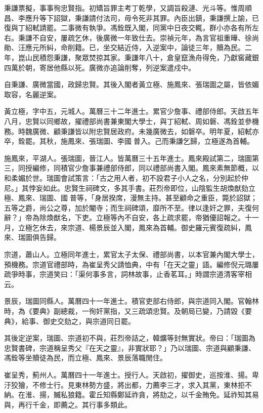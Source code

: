 \begin{pinyinscope}
秉謙票擬，事事徇忠賢指。初矯旨罪主考丁乾學，又調旨殺漣、光斗等。惟周順昌、李應升等下詔獄，秉謙請付法司，毋令死非其罪。內臣出鎮，秉謙撰上諭，已復與丁紹軾請罷。二事微有執爭。馮銓既入閣，同黨中日夜交輒，群小亦各有所左右。秉謙不自安，屢疏乞休，後廣微一年致仕去。崇禎元年，為言官祖重曄、徐尚勛、汪應元所糾，命削籍。已，坐交結近侍，入逆案中，論徒三年，贖為民。二年，崑山民積怨秉謙，聚眾焚掠其家。秉謙年八十，倉皇竄漁舟得免，乃獻窖藏銀四萬於朝，寄居他縣以死。廣微亦追論削奪，列逆案遣戍中。

自秉謙、廣微當國，政歸忠賢。其後入閣者黃立極、施鳳來、張瑞圖之屬，皆依媚取容，名麗逆案。

黃立極，字中五，元城人。萬曆三十二年進士。累官少詹事、禮部侍郎。天啟五年八月，忠賢以同鄉故，擢禮部尚書兼東閣大學士，與丁紹軾、周如磐、馮銓並參機務。時魏廣微、顧秉謙皆以附忠賢居政府。未幾廣微去，如磐卒。明年夏，紹軾亦卒，銓罷。其秋，施鳳來、張瑞圖、李國普入。己而秉謙乞歸，立極遂為首輔。

施鳳來，平湖人。張瑞圖，晉江人。皆萬曆三十五年進士。鳳來殿試第二，瑞圖第三，同授編修，同積官少詹事兼禮部侍郎，同以禮部尚書入閣。鳳來素無節概，以和柔媚於世。瑞圖會試策言：「古之用人者，初不設君子小人之名，分別起於仲尼。」其悖妄如此。忠賢生祠碑文，多其手書。莊烈帝即位，山陰監生胡煥猷劾立極、鳳來、瑞圖、國普等，「身居揆席，漫無主持。甚至顧命之重臣，斃於詔獄；五等之爵，尚公之尊，加於閹寺；而生祠碑頌，靡所不至。律以逢奸之罪，夫復何辭？」帝為除煥猷名，下吏。立極等內不自安，各上疏求罷，帝猶優詔報之。十一月，立極乞休去，來宗道、楊景辰並入閣，鳳來為首輔。御史羅元賓復疏糾，鳳來、瑞圖俱告歸。

宗道，蕭山人。立極同年進士，累官太子太保、禮部尚書，以本官兼內閣大學士，預機務。宗道官禮部時，為崔呈秀父請恤典，中有「在天之靈」語。編修倪元璐屢疏爭時事，宗道笑曰：「渠何事多言，詞林故事，止香茗耳。」時謂宗道清客宰相云。

景辰，瑞圖同縣人。萬曆四十一年進士。積官吏部右侍郎，與宗道同入閣。官翰林時，為《要典》副總裁，一徇奸黨指，又三疏頌忠賢。及朝局已變，乃請毀《要典》，給事、御史交劾之，與宗道同日罷。

其後定逆案，瑞圖、宗道初不與，莊烈帝詰之，韓爌等封無實狀。帝曰：「瑞圖為忠賢書碑，宗道稱呈秀父『在天之靈』，非實狀耶？」乃以瑞圖、宗道與顧秉謙、馮銓等坐贖徒為民，而立極、鳳來、景辰落職閒住。

崔呈秀，薊州人。萬曆四十一年進士。授行人。天啟初，擢御史，巡按淮、揚。卑汙狡獪，不修士行。見東林勢方盛，將出都，力薦李三才，求入其黨，東林拒不納。在淮、揚，贓私狼籍。霍丘知縣鄭延祚貪，將劾之，以千金賄免。延祚知其易與，再行千金，即薦之。其行事多類此。


\end{pinyinscope}
